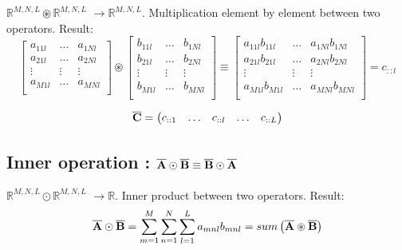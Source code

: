 \documentclass[11pt]{article}
\newcommand{\TRIX}[1]{\mathbf{\overline{\uppercase{#1}}}}
\newcommand{\mulebe}{\circledast}
\newcommand{\mulinner}{\odot}
\newcommand{\dimsep}{,}
\begin{document}
 $\mathbb{R}^{M\dimsep N \dimsep L} \mulebe \mathbb{R}^{M\dimsep N \dimsep L}$ 
 $\rightarrow \mathbb{R}^{M\dimsep N \dimsep L}$.
 Multiplication element by element between two operators. Result: 
\begin{equation}
  \left[
 \begin{matrix}
 a_{11l} &\hdots &a_{1Nl}\\ 
 a_{21l} &\hdots &a_{2Nl}\\
 \vdots &\vdots &\vdots\\ 
 a_{M1l} &\hdots &a_{MNl}\\ 
 \end{matrix}
 \right]\mulebe 
   \left[
 \begin{matrix}
 b_{11l} &\hdots &b_{1Nl}\\ 
 b_{21l} &\hdots &b_{2Nl}\\
 \vdots &\vdots &\vdots\\ 
 b_{M1l} &\hdots &b_{MNl}\\ 
 \end{matrix}
 \right]
 \equiv \left[
 \begin{matrix}
 a_{11l} b_{11l} &\hdots &a_{1Nl} b_{1Nl}\\ 
 a_{21l} b_{21l} &\hdots &a_{2Nl} b_{2Nl}\\
 \vdots &\vdots &\vdots\\ 
 a_{M1l} b_{M1l} &\hdots &a_{MNl} b_{MNl}\\ 
 \end{matrix}
 \right]=c_{::l}
 \end{equation}

 \begin{equation}
\TRIX{C}=\left(
 \begin{matrix}
 c_{::1}&\hdots&c_{::l}&\hdots&c_{::L}\\
 \end{matrix}
 \right)
\end{equation}



\subsection{Inner operation : $\TRIX{A} \mulinner \TRIX{B}\equiv \TRIX{B} \mulinner \TRIX{A}$}

 $\mathbb{R}^{M\dimsep N \dimsep L} \mulinner \mathbb{R}^{M\dimsep N \dimsep L}$ 
 $\rightarrow \mathbb{R}$.
 Inner product between two operators. Result: 
  \begin{equation}
\TRIX{A}\mulinner \TRIX{B} = \sum \limits_{m=1}^{M}\sum \limits_{n=1}^{N}\sum \limits_{l=1}^{L} {a_{mnl} b_{mnl}} = sum\left(\TRIX{A}\mulebe  \TRIX{B}\right)
  \end{equation}
\end{document}
